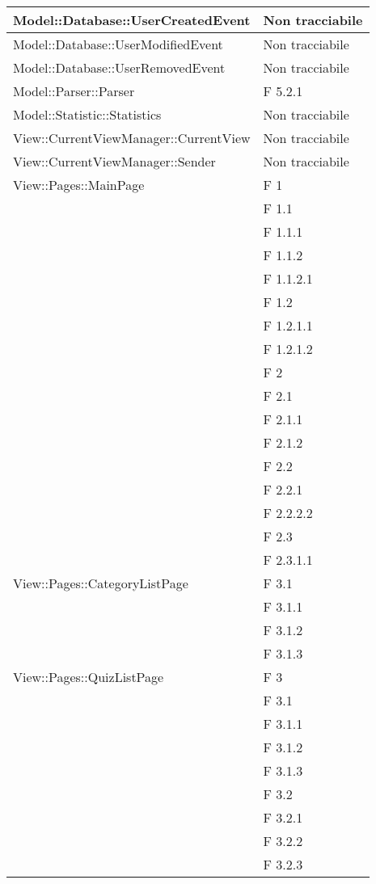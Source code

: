 \begin{longtable}{p{}p{}}
\midrule
Model::Database::UserCreatedEvent 	& Non tracciabile\\

\midrule
Model::Database::UserModifiedEvent	& Non tracciabile\\

\midrule
Model::Database::UserRemovedEvent	& Non tracciabile\\

\midrule
Model::Parser::Parser		& F 5.2.1\\

\midrule
Model::Statistic::Statistics	& Non tracciabile\\

\midrule
View::CurrentViewManager::CurrentView	& Non tracciabile\\

\midrule
View::CurrentViewManager::Sender		& Non tracciabile\\

\midrule
View::Pages::MainPage						& F 1\\
								& F 1.1\\
								& F 1.1.1\\
								& F 1.1.2\\
								& F 1.1.2.1\\
								& F 1.2\\
								& F 1.2.1.1\\
								& F 1.2.1.2\\
								& F 2\\
								& F 2.1\\
								& F 2.1.1\\
								& F 2.1.2\\
								& F 2.2\\
								& F 2.2.1\\
								& F 2.2.2.2\\
								& F 2.3\\
								& F 2.3.1.1\\

\midrule
View::Pages::CategoryListPage					& F 3.1\\
								& F 3.1.1\\
								& F 3.1.2\\
								& F 3.1.3\\

\midrule
View::Pages::QuizListPage					& F 3\\
								& F 3.1\\
								& F 3.1.1\\
								& F 3.1.2\\
								& F 3.1.3\\
								& F 3.2\\
								& F 3.2.1\\
								& F 3.2.2\\
								& F 3.2.3\\
								

\end{longtable}
